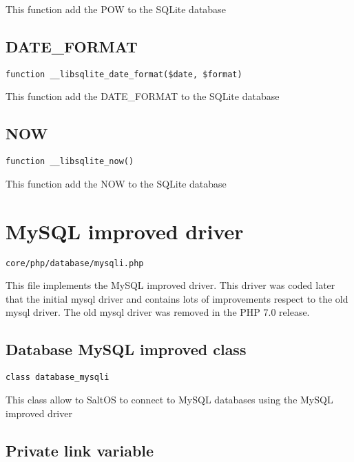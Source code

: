 \documentclass[a4paper]{book}
\begin{document}
This function add the POW to the SQLite database

\hypertarget{toc314}{}
\subsection{DATE\_FORMAT}

\begin{lstlisting}
function __libsqlite_date_format($date, $format)
\end{lstlisting}

This function add the DATE\_FORMAT to the SQLite database

\hypertarget{toc315}{}
\subsection{NOW}

\begin{lstlisting}
function __libsqlite_now()
\end{lstlisting}

This function add the NOW to the SQLite database

\hypertarget{toc316}{}
\section{MySQL improved driver}

\begin{lstlisting}
core/php/database/mysqli.php
\end{lstlisting}

This file implements the MySQL improved driver. This driver was coded later that the initial
mysql driver and contains lots of improvements respect to the old mysql driver. The old mysql
driver was removed in the PHP 7.0 release.

\hypertarget{toc317}{}
\subsection{Database MySQL improved class}

\begin{lstlisting}
class database_mysqli
\end{lstlisting}

This class allow to SaltOS to connect to MySQL databases using the MySQL improved driver

\hypertarget{toc318}{}
\subsection{Private link variable}
\end{document}
